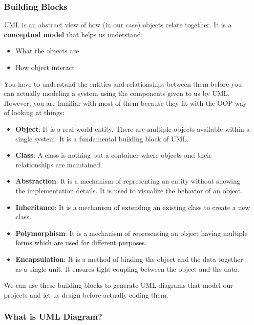 \documentclass[
]{article}
\providecommand{\tightlist}{%
  \setlength{\itemsep}{0pt}\setlength{\parskip}{0pt}}
\begin{document}
\hypertarget{building-blocks}{%
\subsubsection{Building Blocks}\label{building-blocks}}

UML is an abstract view of how (in our case) objects relate together. It
is a \textbf{conceptual model} that helps us understand:

\begin{itemize}
\tightlist
\item
  What the objects are
\item
  How object interact
\end{itemize}

You have to understand the entities and relationships between them
before you can actually modeling a system using the components given to
us by UML. However, you are familiar with most of them because they fit
with the OOP way of looking at things:

\begin{itemize}
\tightlist
\item
  \textbf{Object}: It is a real-world entity. There are multiple objects
  available within a single system. It is a fundamental building block
  of UML.
\item
  \textbf{Class}: A class is nothing but a container where objects and
  their relationships are maintained.
\item
  \textbf{Abstraction}: It is a mechanism of representing an entity
  without showing the implementation details. It is used to visualize
  the behavior of an object.
\item
  \textbf{Inheritance}: It is a mechanism of extending an existing class
  to create a new class.
\item
  \textbf{Polymorphism}: It is a mechanism of representing an object
  having multiple forms which are used for different purposes.
\item
  \textbf{Encapsulation}: It is a method of binding the object and the
  data together as a single unit. It ensures tight coupling between the
  object and the data.
\end{itemize}

We can use these building blocks to generate UML diagrams that model our
projects and let us design before actually coding them.

\hypertarget{what-is-uml-diagram}{%
\subsubsection{What is UML Diagram?}\label{what-is-uml-diagram}}
\end{document}
